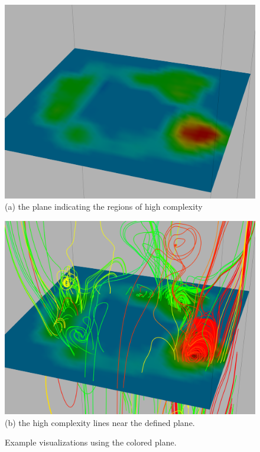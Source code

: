 \documentclass{egpubl}
\begin{document}
\begin{figure}[h]
        \centering
                \begin{minipage}{0.45\linewidth}
                        \small
                        \includegraphics[height = 0.75\linewidth]{Images/plane_crop.png}\\(a) the plane indicating the regions of high complexity\vspace{0.2em}
                \end{minipage}
                \begin{minipage}{0.45\linewidth}
                        \small
                        \includegraphics[height = 0.75\linewidth]{Images/plane_line_crop.png}\\(b) the high complexity lines near the defined plane.\vspace{0.2em}
                \end{minipage}
        \caption{Example visualizations using the colored plane.}
        \label{fig:plane}
\end{figure}
\end{document}

